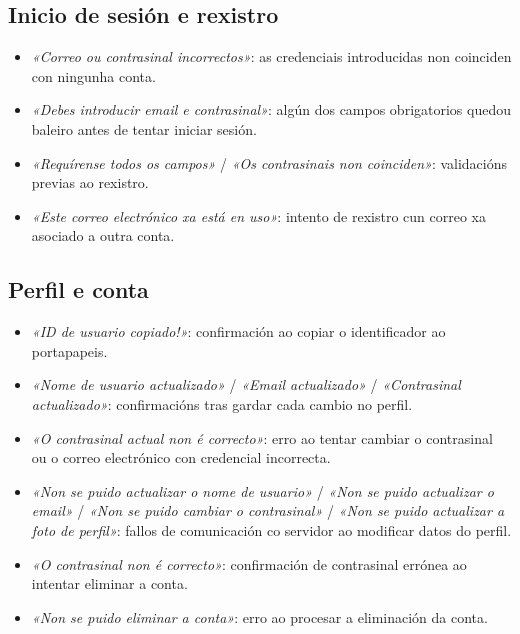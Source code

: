 \subsection*{Inicio de sesión e rexistro}
\begin{itemize}
  \item \textit{«Correo ou contrasinal incorrectos»}: as credenciais introducidas non
        coinciden con ningunha conta.
  \item \textit{«Debes introducir email e contrasinal»}: algún dos campos obrigatorios
        quedou baleiro antes de tentar iniciar sesión.
  \item \textit{«Requírense todos os campos»} / \textit{«Os contrasinais non coinciden»}:
        validacións previas ao rexistro.
  \item \textit{«Este correo electrónico xa está en uso»}: intento de rexistro cun correo
        xa asociado a outra conta.
\end{itemize}

\subsection*{Perfil e conta}
\begin{itemize}
  \item \textit{«ID de usuario copiado!»}: confirmación ao copiar o identificador ao
        portapapeis.
  \item \textit{«Nome de usuario actualizado»} / \textit{«Email actualizado»} /
        \textit{«Contrasinal actualizado»}: confirmacións tras gardar cada cambio no perfil.
  \item \textit{«O contrasinal actual non é correcto»}: erro ao tentar cambiar o
        contrasinal ou o correo electrónico con credencial incorrecta.
  \item \textit{«Non se puido actualizar o nome de usuario»} /
        \textit{«Non se puido actualizar o email»} /
        \textit{«Non se puido cambiar o contrasinal»} /
        \textit{«Non se puido actualizar a foto de perfil»}: fallos de comunicación co
        servidor ao modificar datos do perfil.
  \item \textit{«O contrasinal non é correcto»}: confirmación de contrasinal errónea ao
        intentar eliminar a conta.
  \item \textit{«Non se puido eliminar a conta»}: erro ao procesar a eliminación da conta.
\end{itemize}

